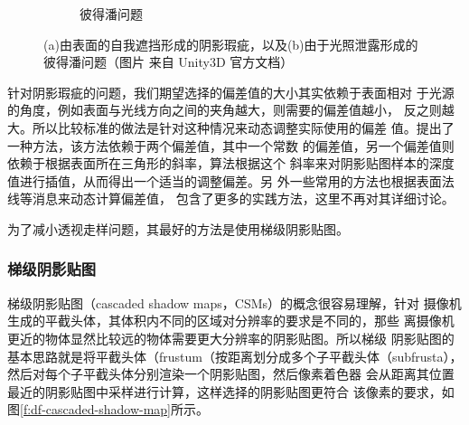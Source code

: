 \begin{figure}
\begin{subfigure}[b]{0.5\textwidth}
		\caption{彼得潘问题}
	\end{subfigure}
	\caption{(a)由表面的自我遮挡形成的阴影瑕疵，以及(b)由于光照泄露形成的彼得潘问题（图片 来自 Unity3D 官方文档）}
	\label{f:df-depth-bias}
\end{figure}

针对阴影瑕疵的问题，我们期望选择的偏差值的大小其实依赖于表面相对 于光源的角度，例如表面与光线方向之间的夹角越大，则需要的偏差值越小， 反之则越大。所以比较标准的做法是针对这种情况来动态调整实际使用的偏差 值。\cite{a:Eliminatesurfaceacnewithgradientshadowmapping}提出了一种方法，该方法依赖于两个偏差值，其中一个常数 的偏差值，另一个偏差值则依赖于根据表面所在三角形的斜率，算法根据这个 斜率来对阴影贴图样本的深度值进行插值，从而得出一个适当的调整偏差。另 外一些常用的方法也根据表面法线等消息来动态计算偏差值\cite{a:Adaptivedepthbiasforshadowmaps}， \cite{b:rts}包含了更多的实践方法，这里不再对其详细讨论。

  为了减小透视走样问题，其最好的方法是使用梯级阴影贴图。




\subsubsection{梯级阴影贴图}
梯级阴影贴图（cascaded shadow maps，CSMs）的概念很容易理解，针对 摄像机生成的平截头体，其体积内不同的区域对分辨率的要求是不同的，那些 离摄像机更近的物体显然比较远的物体需要更大分辨率的阴影贴图。所以梯级 阴影贴图的基本思路就是将平截头体（frustum（按距离划分成多个子平截头体（subfrusta），然后对每个子平截头体分别渲染一个阴影贴图，然后像素着色器 会从距离其位置最近的阴影贴图中采样进行计算，这样选择的阴影贴图更符合 该像素的要求，如图\ref{f:df-cascaded-shadow-map}所示。

